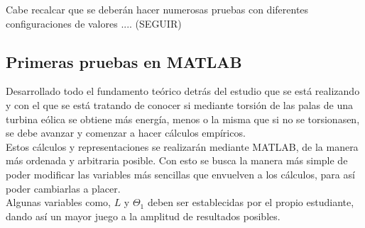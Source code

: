 Cabe recalcar que se deberán hacer numerosas pruebas con diferentes configuraciones de valores .... (SEGUIR)
 
\subsection{Primeras pruebas en MATLAB}

Desarrollado todo el fundamento teórico detrás del estudio que se está realizando y con el que se está tratando de conocer si mediante torsión de las palas de una turbina eólica se obtiene más energía, menos o la misma que si no se torsionasen, se debe avanzar y comenzar a hacer cálculos empíricos. \\

Estos cálculos y representaciones se realizarán mediante MATLAB, de la manera más ordenada y arbitraria posible. Con esto se busca la manera más simple de poder modificar las variables más sencillas que envuelven a los cálculos, para así poder cambiarlas a placer. \\

Algunas variables como, $L$ y $\Theta_1$ deben ser establecidas por el propio estudiante, dando así un mayor juego a la amplitud de resultados posibles. \\
